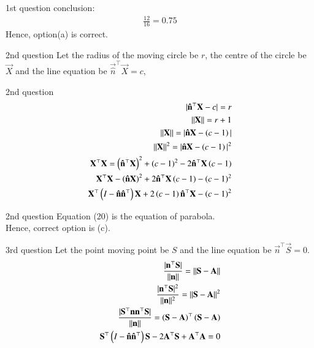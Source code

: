 \documentclass{beamer}
\begin{document}
\begin{frame}{1st question}
    conclusion:
\begin{align}
    \frac{12}{16}=0.75
\end{align}
Hence, option(a) is correct.
\end{frame}

\begin{frame}{2nd question}
    Let the radius of the moving circle be $r$, the centre of the circle be $\vec{X}$ and the line equation be $\vec{\hat{n}}^\top\vec{X}=c$,
\end{frame}

\begin{frame}{2nd question}
    \begin{align}
    |\mathbf{\hat{n}}^\top\mathbf{X}-c|=r\\
    ||\mathbf{X}||=r+1\\
    ||\mathbf{X}||=|\mathbf{\hat{n}}\mathbf{X}-\left(c-1\right)|\\
    ||\mathbf{X}||^2=|\mathbf{\hat{n}}\mathbf{X}-\left(c-1\right)|^2\\
    \mathbf{X}^\top\mathbf{X}=\left(\mathbf{\hat{n}^\top\mathbf{X}}\right)^2+\left(c-1\right)^2-2\mathbf{\hat{n}}^\top\mathbf{X}\left(c-1\right)\\
    \mathbf{X}^\top\mathbf{X}-\left(\mathbf{\hat{n}}\mathbf{X}\right)^2+2\mathbf{\hat{n}^\top\mathbf{X}}\left(c-1\right)-\left(c-1\right)^2\\
    \mathbf{X}^\top\left(I-\mathbf{\hat{n}}\mathbf{\hat{n}}^\top\right)\mathbf{X}+2\left(c-1\right)\mathbf{\hat{n}^\top\mathbf{X}}-\left(c-1\right)^2
\end{align}
\end{frame}

\begin{frame}{2nd question}
Equation (20) is the equation of parabola.\\
Hence, correct option is (c).
\end{frame}

\begin{frame}{3rd question}
    Let the point moving point be $S$ and the line equation be $\vec{n}^\top\vec{S}=0$.
\begin{align}
    \frac{|\mathbf{n}^\top\mathbf{S}|}{||\mathbf{n}||}=||\mathbf{S}-\mathbf{A}||\\
    \frac{|\mathbf{n}^\top\mathbf{S}|^2}{||\mathbf{n}||^2}=||\mathbf{S}-\mathbf{A}||^2\\
    \frac{|\mathbf{S}^\top\mathbf{n}\mathbf{n}^\top\mathbf{S}|}{||\mathbf{n}||}=\left(\mathbf{S}-\mathbf{A}\right)^\top\left(\mathbf{S}-\mathbf{A}\right)\\
    \mathbf{S}^\top\left(I-\mathbf{\hat{n}}\mathbf{\hat{n}}^\top\right)\mathbf{S}-2\mathbf{A}^\top\mathbf{S}+\mathbf{A}^\top\mathbf{A}=0
\end{align}
\end{frame}
\end{document}
